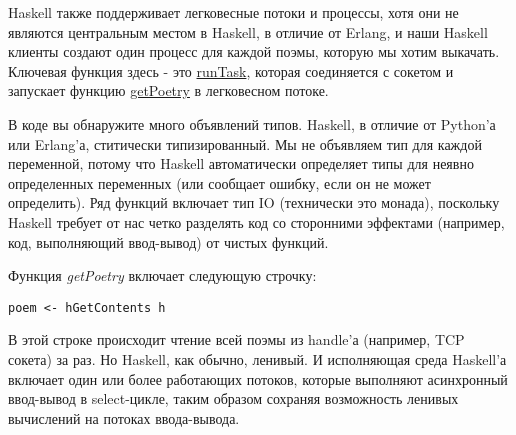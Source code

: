 Haskell также поддерживает легковесные потоки и процессы, хотя 
они не являются центральным местом в Haskell, в отличие от Erlang, 
и наши Haskell клиенты создают один процесс для каждой 
поэмы, которую мы хотим выкачать. Ключевая функция здесь - это 
\href{https://github.com/jdavisp3/twisted-intro/blob/master/haskell-client-1/get-poetry.hs#L64}{runTask}, 
которая соединяется с сокетом и запускает функцию 
\href{https://github.com/jdavisp3/twisted-intro/blob/master/haskell-client-1/get-poetry.hs#L48}{getPoetry} 
в легковесном потоке.


В коде вы обнаружите много объявлений типов. Haskell, в отличие от Python'а  
или Erlang'а, ститически типизированный. Мы не объявляем тип для каждой 
переменной, потому что Haskell автоматически определяет типы для неявно 
определенных переменных (или сообщает ошибку, если он не может определить). 
Ряд функций включает тип IO (технически это монада), поскольку Haskell 
требует от нас четко разделять код со сторонними эффектами (например, 
код, выполняющий ввод-вывод) от чистых функций.


Функция \textit{getPoetry} включает следующую строчку:

 \begin{verbatim}
poem <- hGetContents h
\end{verbatim} 


В этой строке происходит чтение всей поэмы из handle'а (например, TCP сокета) 
за раз. Но Haskell, как обычно, ленивый. И исполняющая среда  Haskell'а 
включает один или более работающих потоков, которые выполняют 
асинхронный ввод-вывод в select-цикле, таким образом сохраняя  
возможность ленивых вычислений на потоках ввода-вывода.
 

